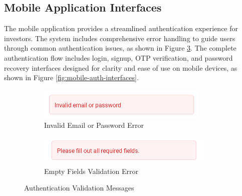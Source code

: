 \subsection{Mobile Application Interfaces}
The mobile application provides a streamlined authentication experience for investors. The system includes comprehensive error handling to guide users through common authentication issues, as shown in Figure \ref{fig:mobile-auth-errors}. The complete authentication flow includes login, signup, OTP verification, and password recovery interfaces designed for clarity and ease of use on mobile devices, as shown in Figure \ref{fig:mobile-auth-interfaces}.
\begin{figure}[htbp]
    \centering
    \begin{subfigure}[b]{0.45\textwidth}
        \centering
        \includegraphics[width=\textwidth]{images/mobile-auth-screen_invalidemailorpass.png}
        \caption{Invalid Email or Password Error}
        \label{fig:mobile-invalid-credentials}
    \end{subfigure}
    \hfill
    \begin{subfigure}[b]{0.45\textwidth}
        \centering
        \includegraphics[width=\textwidth]{images/mobile-auth-screen_emptyfieldsmessage.png}
        \caption{Empty Fields Validation Error}
        \label{fig:mobile-empty-fields}
    \end{subfigure}
    \caption{Authentication Validation Messages}
    \label{fig:mobile-auth-errors}
\end{figure}


